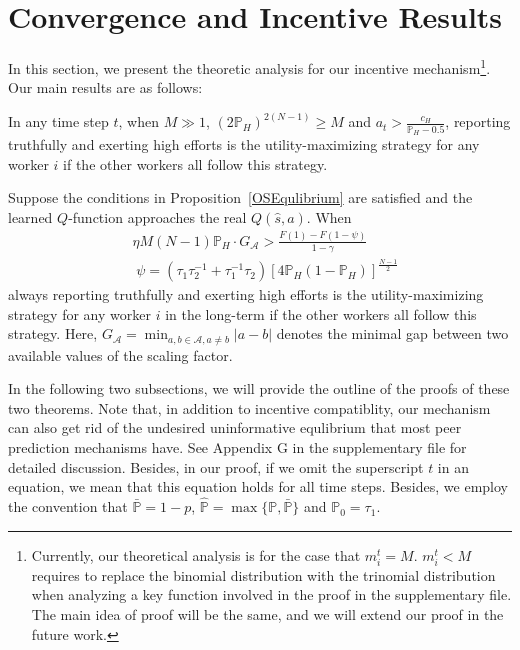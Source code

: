 \section{Convergence and Incentive Results}
\label{analysis}
In this section, we present the theoretic analysis for our incentive mechanism\footnote{Currently, our theoretical analysis is for the case that $m_i^t=M$. $m_i^t<M$ requires to replace the binomial distribution with the trinomial distribution when analyzing a key function involved in the proof in the supplementary file. The main idea of proof will be the same, and we will extend our proof in the future work.}. Our main results are as follows:
\begin{theorem}
\label{OSEqulibrium}
In any time step $t$, when $M\gg 1$, $(2\mathbb{P}_H)^{2(N-1)} \geq M$ and $a_t>\frac{c_H}{\mathbb{P}_H-0.5}$, reporting truthfully and exerting high efforts is the utility-maximizing strategy for any worker $i$ if the other workers all follow this strategy.
\end{theorem}
\begin{theorem}
\label{RMNE}
Suppose the conditions in Proposition~\ref{OSEqulibrium} are satisfied and the learned $Q$-function approaches the real $Q(\hat{s},a)$. When
\begin{align}
&\eta M(N-1)\mathbb{P}_H \cdot G_{\mathcal{A}}> \frac{F(1)-F(1-\psi)}{1-\gamma}\label{Condition}\\
&\;\psi =(\tau_1\tau_2^{-1}+\tau_1^{-1}\tau_2)[4\mathbb{P}_H(1-\mathbb{P}_H)]^{\frac{N-1}{2}} \label{equation:psi}
\end{align}
always reporting truthfully and exerting high efforts is the utility-maximizing strategy for any worker $i$ in the long-term if the other workers all follow this strategy. Here, $G_{\mathcal{A}}=\min_{a,b\in\mathcal{A}, a\neq b}|a-b|$ denotes the minimal gap between two available values of the scaling factor.
\end{theorem}
In the following two subsections, we will provide the outline of the proofs of these two theorems. 
Note that, in addition to incentive compatiblity, our mechanism can also get rid of the undesired uninformative equlibrium that most peer prediction mechanisms have.
See Appendix G in the supplementary file for detailed discussion.
Besides, in our proof, if we omit the superscript $t$ in an equation, we mean that this equation holds for all time steps.
Besides, we employ the convention that $\bar{\mathbb{P}}=1-p$, $\hat{\mathbb{P}}=\max \{\mathbb{P}, \bar{\mathbb{P}}\}$ and $\mathbb{P}_0=\tau_1$.


